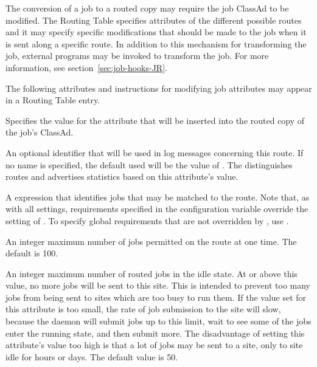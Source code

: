 The conversion of a job to a routed copy may require the
job ClassAd to be modified.
The Routing Table specifies attributes of the different possible
routes and it may specify specific modifications that should be made
to the job when it is sent along a specific route.  In addition
to this mechanism for transforming the job, external programs may be
invoked to transform the job.  For more information, see
section~\ref{sec:job-hooks-JR}.

The following attributes and instructions for modifying job attributes
may appear in a Routing Table entry.

\begin{description}

\item[GridResource] Specifies the value for the 
attribute that will be inserted into the routed copy of the job's ClassAd.

\item[Name] An optional identifier that will be used in log
messages concerning this route.  If no name is specified, the default
used will be the value of .
The  distinguishes routes and advertises
statistics based on this attribute's value.

\item[Requirements] A  expression
that identifies jobs that may be matched to the route.  Note
that, as with all settings, requirements specified in
the configuration variable
 override the setting of
.  To specify global requirements that
are not overridden by , use
.

\item[MaxJobs] An integer maximum number of jobs permitted on the route at
one time. The default is 100.

\item[MaxIdleJobs] An integer maximum number of routed jobs in the
idle state.  At or above this value, no more jobs will be sent
to this site.
This is intended to prevent too many jobs from being sent to sites
which are too busy to run them.
If the value set for this attribute is too small,
the rate of job submission to the site will slow,
because the  daemon will submit jobs up to this limit,
wait to see some of the jobs enter the running state,
and then submit more.
The disadvantage of setting this attribute's value too high
is that a lot of jobs may be sent
to a site, only to site idle for hours or days.
The default value is 50.


\end{description}
